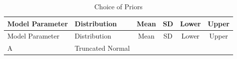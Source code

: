 \documentclass[11pt,]{article}
\begin{document}
\begin{longtable}[]{@{}llcccc@{}}
\caption{Choice of Priors}\tabularnewline
\toprule
\begin{minipage}[b]{0.28\columnwidth}\raggedright\strut
Model Parameter\strut
\end{minipage} & \begin{minipage}[b]{0.20\columnwidth}\raggedright\strut
Distribution\strut
\end{minipage} & \begin{minipage}[b]{0.08\columnwidth}\centering\strut
Mean\strut
\end{minipage} & \begin{minipage}[b]{0.06\columnwidth}\centering\strut
SD\strut
\end{minipage} & \begin{minipage}[b]{0.09\columnwidth}\centering\strut
Lower\strut
\end{minipage} & \begin{minipage}[b]{0.09\columnwidth}\centering\strut
Upper\strut
\end{minipage}\tabularnewline
\midrule
\endfirsthead
\toprule
\begin{minipage}[b]{0.28\columnwidth}\raggedright\strut
Model Parameter\strut
\end{minipage} & \begin{minipage}[b]{0.20\columnwidth}\raggedright\strut
Distribution\strut
\end{minipage} & \begin{minipage}[b]{0.08\columnwidth}\centering\strut
Mean\strut
\end{minipage} & \begin{minipage}[b]{0.06\columnwidth}\centering\strut
SD\strut
\end{minipage} & \begin{minipage}[b]{0.09\columnwidth}\centering\strut
Lower\strut
\end{minipage} & \begin{minipage}[b]{0.09\columnwidth}\centering\strut
Upper\strut
\end{minipage}\tabularnewline
\midrule
\endhead
\begin{minipage}[t]{0.28\columnwidth}\raggedright\strut
A\strut
\end{minipage} & \begin{minipage}[t]{0.20\columnwidth}\raggedright\strut
Truncated Normal\strut
\end{minipage} & \begin{minipage}[t]{0.08\columnwidth}\centering\strut

\end{minipage}
\end{longtable}
\end{document}
